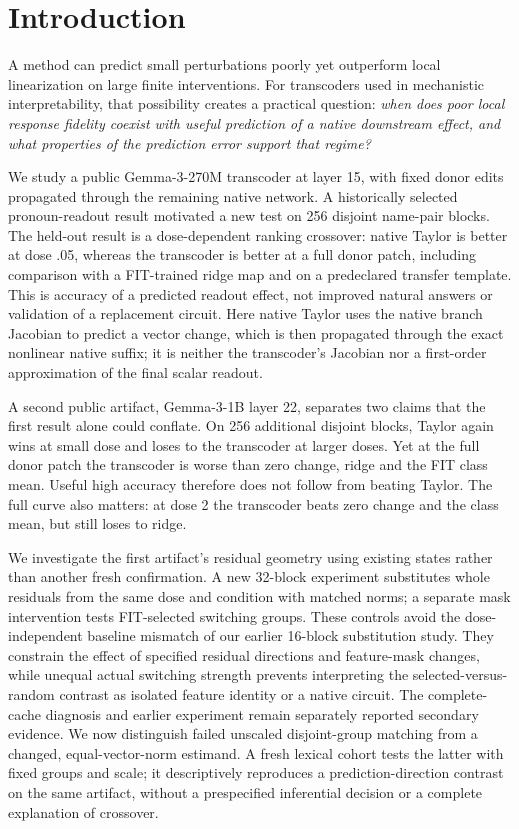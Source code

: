 
\section{Introduction}
A method can predict small perturbations poorly yet outperform local linearization on large finite interventions. For transcoders used in mechanistic interpretability, that possibility creates a practical question: \emph{when does poor local response fidelity coexist with useful prediction of a native downstream effect, and what properties of the prediction error support that regime?}

We study a public Gemma-3-270M transcoder at layer 15, with fixed donor edits propagated through the remaining native network. A historically selected pronoun-readout result motivated a new test on 256 disjoint name-pair blocks. The held-out result is a dose-dependent ranking crossover: native Taylor is better at dose .05, whereas the transcoder is better at a full donor patch, including comparison with a FIT-trained ridge map and on a predeclared transfer template. This is accuracy of a predicted readout effect, not improved natural answers or validation of a replacement circuit. Here native Taylor uses the native branch Jacobian to predict a vector change, which is then propagated through the exact nonlinear native suffix; it is neither the transcoder's Jacobian nor a first-order approximation of the final scalar readout.

A second public artifact, Gemma-3-1B layer 22, separates two claims that the first result alone could conflate. On 256 additional disjoint blocks, Taylor again wins at small dose and loses to the transcoder at larger doses. Yet at the full donor patch the transcoder is worse than zero change, ridge and the FIT class mean. Useful high accuracy therefore does not follow from beating Taylor. The full curve also matters: at dose 2 the transcoder beats zero change and the class mean, but still loses to ridge.

We investigate the first artifact's residual geometry using existing states rather than another fresh confirmation. A new 32-block experiment substitutes whole residuals from the same dose and condition with matched norms; a separate mask intervention tests FIT-selected switching groups. These controls avoid the dose-independent baseline mismatch of our earlier 16-block substitution study. They constrain the effect of specified residual directions and feature-mask changes, while unequal actual switching strength prevents interpreting the selected-versus-random contrast as isolated feature identity or a native circuit. The complete-cache diagnosis and earlier experiment remain separately reported secondary evidence. We now distinguish failed unscaled disjoint-group matching from a changed, equal-vector-norm estimand. A fresh lexical cohort tests the latter with fixed groups and scale; it descriptively reproduces a prediction-direction contrast on the same artifact, without a prespecified inferential decision or a complete explanation of crossover.

